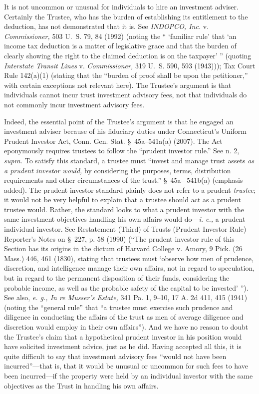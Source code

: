   It is not uncommon or unusual for individuals to hire an investment adviser. Certainly the Trustee, who has the burden of establishing its entitlement to the deduction, has not demonstrated that it is. See \emph{INDOPCO, Inc.} v. \emph{Commissioner,} 503 U.~S. 79, 84 (1992) (noting the `` ‘familiar rule' that ‘an income tax deduction is a matter of legislative grace and that the burden of clearly showing the right to the claimed deduction is on the taxpayer' '' (quoting \emph{Interstate Transit Lines} v. \emph{Commissioner,} 319 U.~S. 590, 593 (1943))); \newpage  Tax Court Rule 142(a)(1) (stating that the ``burden of proof shall be upon the petitioner,'' with certain exceptions not relevant here). The Trustee's argument is that individuals cannot incur trust investment advisory fees, not that individuals do not commonly incur investment advisory fees.

  Indeed, the essential point of the Trustee's argument is that he engaged an investment adviser because of his fiduciary duties under Connecticut's Uniform Prudent Investor Act, Conn. Gen. Stat. \S~45a--541a(a) (2007). The Act eponymously requires trustees to follow the ``prudent investor rule.'' See n. 2, \emph{supra.} To satisfy this standard, a trustee must ``invest and manage trust assets \emph{as a prudent investor would,} by considering the purposes, terms, distribution requirements and other circumstances of the trust.'' \S~45a-- 541b(a) (emphasis added). The prudent investor standard plainly does not refer to a prudent \emph{trustee}; it would not be very helpful to explain that a trustee should act as a prudent trustee would. Rather, the standard looks to what a prudent investor with the same investment objectives handling his own affairs would do---\emph{i. e.,} a prudent individual investor. See Restatement (Third) of Trusts (Prudent Investor Rule) Reporter's Notes on \S~227, p. 58 (1990) (``The prudent investor rule of this Section has its origins in the dictum of Harvard College v. Amory, 9 Pick. (26 Mass.) 446, 461 (1830), stating that trustees must ‘observe how men of prudence, discretion, and intelligence manage their own affairs, not in regard to speculation, but in regard to the permanent disposition of their funds, considering the probable income, as well as the probable safety of the capital to be invested' ''). See also, \emph{e. g., In re Musser's Estate,} 341 Pa. 1, 9--10, 17 A. 2d 411, 415 (1941) (noting the ``general rule'' that ``a trustee must exercise such prudence and diligence in conducting the affairs of the trust as men of average diligence and discretion would employ in their own affairs''). And we have no reason to doubt the Trustee's claim that a hypothetical prudent investor in his position would have solicited investment advice, \newpage  just as he did. Having accepted all this, it is quite difficult to say that investment advisory fees ``would not have been incurred''---that is, that it would be unusual or uncommon for such fees to have been incurred---if the property were held by an individual investor with the same objectives as the Trust in handling his own affairs.

